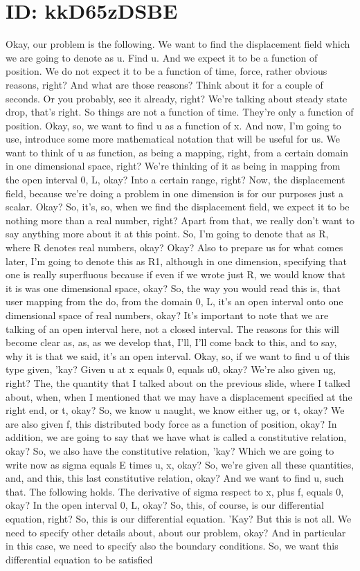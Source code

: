 \documentclass[10pt]{article}
\begin{document}
\section*{ID: kkD65zDSBE}
Okay, our problem is the following. We want to find the displacement field which we are going to denote as u. Find u. And we expect it to be a function of position. We do not expect it to be a function of time, force, rather obvious reasons, right? And what are those reasons? Think about it for a couple of seconds. Or you probably, see it already, right? We're talking about steady state drop, that's right. So things are not a function of time. They're only a function of position. Okay, so, we want to find u as a function of x. And now, I'm going to use, introduce some more mathematical notation that will be useful for us. We want to think of u as function, as being a mapping, right, from a certain domain in one dimensional space, right? We're thinking of it as being in mapping from the open interval 0, L, okay? Into a certain range, right? Now, the displacement field, because we're doing a problem in one dimension is for our purposes just a scalar. Okay? So, it's, so, when we find the displacement field, we expect it to be nothing more than a real number, right? Apart from that, we really don't want to say anything more about it at this point. So, I'm going to denote that as R, where R denotes real numbers, okay? Okay? Also to prepare us for what comes later, I'm going to denote this as R1, although in one dimension, specifying that one is really superfluous because if even if we wrote just R, we would know that it is was one dimensional space, okay? So, the way you would read this is, that user mapping from the do, from the domain 0, L, it's an open interval onto one dimensional space of real numbers, okay? It's important to note that we are talking of an open interval here, not a closed interval. The reasons for this will become clear as, as, as we develop that, I'll, I'll come back to this, and to say, why it is that we said, it's an open interval. Okay, so, if we want to find u of this type given, 'kay? Given u at x equals 0, equals u0, okay? We're also given ug, right? The, the quantity that I talked about on the previous slide, where I talked about, when, when I mentioned that we may have a displacement specified at the right end, or t, okay? So, we know u naught, we know either ug, or t, okay? We are also given f, this distributed body force as a function of position, okay? In addition, we are going to say that we have what is called a constitutive relation, okay? So, we also have the constitutive relation, 'kay? Which we are going to write now as sigma equals E times u, x, okay? So, we're given all these quantities, and, and this, this last constitutive relation, okay? And we want to find u, such that. The following holds. The derivative of sigma respect to x, plus f, equals 0, okay? In the open interval 0, L, okay? So, this, of course, is our differential equation, right? So, this is our differential equation. 'Kay? But this is not all. We need to specify other details about, about our problem, okay? And in particular in this case, we need to specify also the boundary conditions. So, we want this differential equation to be satisfied 
\end{document}
